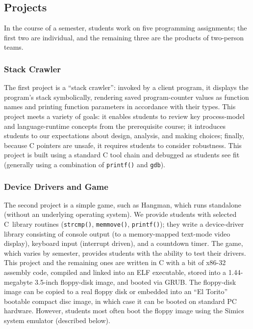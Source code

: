 \subsection{Projects}

In the course of a semester, students work on five
programming assignments; the first two are individual,
and the remaining three are the products of two-person
teams.

\subsubsection{Stack Crawler}
The first project is a ``stack crawler'':  invoked by
a client program, it displays the program's stack
symbolically, rendering saved program-counter values
as function names and printing function parameters
in accordance with their types.
This project meets a variety of goals:
it enables students to review key process-model and
language-runtime concepts from the
prerequisite course;
it introduces students to our expectations about
design, analysis, and making choices;
finally,
because C pointers are unsafe, it requires students
to consider robustness.
%
This project is built using a standard C tool chain
and debugged as students see fit (generally using
a combination of \texttt{printf()} and \texttt{gdb}).

\subsubsection{Device Drivers and Game}
The second project is a simple game, such as Hangman,
which runs standalone (without an underlying
operating system).
We provide students with selected C~library routines
(\texttt{strcmp()}, \texttt{memmove()}, \texttt{printf()});
they write a device-driver library consisting of
console output (to a memory-mapped text-mode video display),
keyboard input (interrupt driven),
and a countdown timer.
The game, which varies by semester, provides students
with the ability to test their drivers.
%
%
This project and the remaining ones are written in
C with a bit of x86-32 assembly code,
compiled and linked into an ELF executable,
stored into a 1.44-megabyte 3.5-inch floppy-disk image,
and booted via GRUB.
The floppy-disk image can be copied to a real floppy disk
or embedded into an ``El Torito'' bootable compact disc image,
in which case it can be booted on standard PC hardware.
However, students most often boot the floppy image
using the Simics system emulator (described below).

